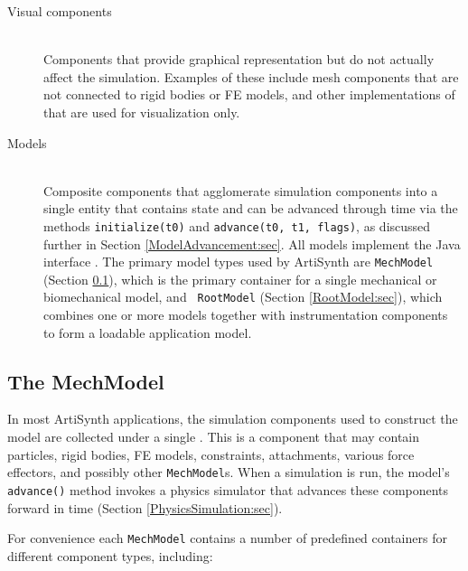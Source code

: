 \begin{description}
\item[Visual components] \mbox{}\hfill\\
Components that provide graphical representation but do not actually affect the
simulation. Examples of these include mesh components that are not connected to
rigid bodies or FE models, and other implementations of 
 that are used for
visualization only.

\item[Models] \mbox{}\hfill\\
Composite components that agglomerate simulation components into a single
entity that contains state and can be advanced through time via the methods
{\tt initialize(t0)} and {\tt advance(t0, t1, flags)}, as discussed further in
Section \ref{ModelAdvancement:sec}. All models implement the Java interface
. The primary model types used by
ArtiSynth are {\tt MechModel} (Section \ref{MechModel:sec}), which is the
primary container for a single mechanical or biomechanical model, and {\tt
RootModel} (Section \ref{RootModel:sec}), which combines one or more models
together with instrumentation components to form a loadable application model.

\end{description}

\subsection{The MechModel}
\label{MechModel:sec}

In most ArtiSynth applications, the simulation components 
used to construct the
model are collected under a single
.
This is a 
 component that may
contain particles, rigid bodies, FE models, constraints, attachments, various
force effectors, and possibly other {\tt MechModel}s.  When a simulation is
run, the model's {\tt advance()} method invokes a physics simulator that
advances these components forward in time (Section
\ref{PhysicsSimulation:sec}).

For convenience each {\tt MechModel} contains a number of predefined
containers for different component types, including:

